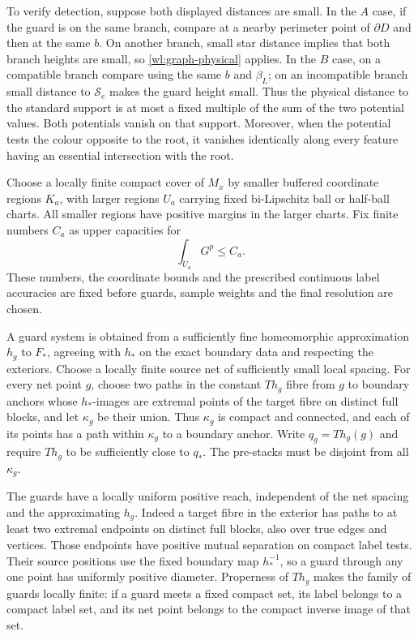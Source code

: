 To verify detection, suppose both displayed distances are small.  In
the $A$ case, if the guard is on the same branch, compare at a nearby
perimeter point of $\partial D$ and then at the same $b$.  On another
branch, small star distance implies that both branch heights are
small, so \eqref{wl:graph-physical} applies.  In the $B$ case, on a
compatible branch compare using the same $b$ and $\beta_L$; on an
incompatible branch small distance to $\mathcal S_e$ makes the guard
height small.  Thus the physical distance to the standard support is
at most a fixed multiple of the sum of the two potential values.
Both potentials vanish on that support.  Moreover, when the potential
tests the colour opposite to the root, it vanishes identically along
every feature having an essential intersection with the root.

\begin{definition}\label{wl:guards}
Choose a locally finite compact cover of $M_x$ by smaller buffered
coordinate regions $K_a$, with larger regions $U_a$ carrying fixed
bi-Lipschitz ball or half-ball charts.  All smaller regions have
positive margins in the larger charts.  Fix finite numbers $C_a$ as
upper capacities for
\begin{equation}\label{wl:prior-capacity}
 \int_{U_a}G^p\leq C_a.
\end{equation}
These numbers, the coordinate bounds and the prescribed continuous
label accuracies are fixed before guards, sample weights and the
final resolution are chosen.

A guard system is obtained from a sufficiently fine homeomorphic
approximation $h_g$ to $F_*$, agreeing with $h_*$ on the exact boundary
data and respecting the exteriors.  Choose a locally finite source
net of sufficiently small local spacing.  For every net point $g$,
choose two paths in the constant $Th_g$ fibre from $g$ to boundary
anchors whose $h_*$-images are extremal points of the target fibre
on distinct full blocks, and let $\kappa_g$ be their union.  Thus
$\kappa_g$ is compact and connected, and each of its points has a
path within $\kappa_g$ to a boundary anchor.  Write
$q_g=Th_g(g)$ and require $Th_g$ to be sufficiently close to $q_*$.
The pre-stacks must be disjoint from all $\kappa_g$.
\end{definition}

The guards have a locally uniform positive reach, independent of the
net spacing and the approximating $h_g$.  Indeed a target fibre in
the exterior has paths to at least two extremal endpoints on distinct
full blocks, also over true edges and vertices.  Those endpoints have
positive mutual separation on compact label tests.  Their source
positions use the fixed boundary map $h_*^{-1}$, so a guard through
any one point has uniformly positive diameter.  Properness of
$Th_g$ makes the family of guards locally finite: if a guard meets a
fixed compact set, its label belongs to a compact label set, and its
net point belongs to the compact inverse image of that set.

